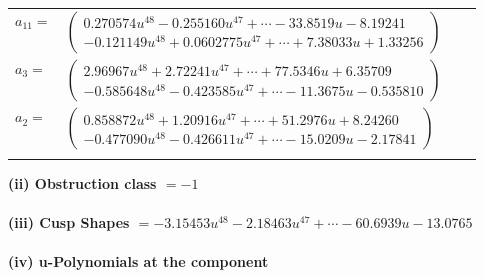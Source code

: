 \documentclass[1p]{elsarticle_modified}
\theoremstyle{definition}
\begin{document}
\begin{tabular}{m{7pt} m{180pt} m{7pt} m{180pt} }
\flushright $a_{11}=$&$\begin{pmatrix}0.270574 u^{48}-0.255160 u^{47}+\cdots-33.8519 u-8.19241\\-0.121149 u^{48}+0.0602775 u^{47}+\cdots+7.38033 u+1.33256\end{pmatrix}$ \\
\flushright $a_{3}=$&$\begin{pmatrix}2.96967 u^{48}+2.72241 u^{47}+\cdots+77.5346 u+6.35709\\-0.585648 u^{48}-0.423585 u^{47}+\cdots-11.3675 u-0.535810\end{pmatrix}$ \\
\flushright $a_{2}=$&$\begin{pmatrix}0.858872 u^{48}+1.20916 u^{47}+\cdots+51.2976 u+8.24260\\-0.477090 u^{48}-0.426611 u^{47}+\cdots-15.0209 u-2.17841\end{pmatrix}$\\&\end{tabular}
\flushleft \textbf{(ii) Obstruction class $= -1$}\\~\\
\flushleft \textbf{(iii) Cusp Shapes $= -3.15453 u^{48}-2.18463 u^{47}+\cdots-60.6939 u-13.0765$}\\~\\
\newpage\renewcommand{\arraystretch}{1}
\flushleft \textbf{(iv) u-Polynomials at the component}\newline \\
\end{document}
